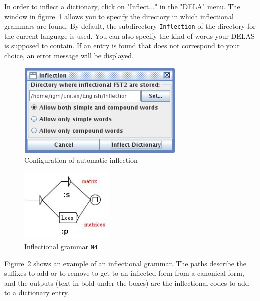 \bigskip
\noindent In order to  inflect a dictionary, click on "Inflect..." in the "DELA" menu. The
window in figure~\ref{fig-inflection-configuration} allows you to specify the
directory in which inflectional grammars are found. By default, the subdirectory
\verb+Inflection+ of the directory for the current language is used. You can
also specify the kind of words your DELAS is supposed to contain. If an entry is
found that does not correspond to your choice, an error message will be
displayed.

\bigskip
\begin{figure}[h]
\begin{center}
\includegraphics[width=8cm]{resources/img/fig3-7.png}
\caption{Configuration of automatic inflection\label{fig-inflection-configuration}}
\end{center}
\end{figure}

\bigskip
\begin{figure}[h]
\begin{center}
\includegraphics[width=4.5cm]{resources/img/fig3-8.png}
\caption{Inflectional grammar
\texttt{N4}\label{fig-example-inflectional-grammar}}
\end{center}
\end{figure}

\bigskip
\noindent Figure~\ref{fig-example-inflectional-grammar} shows an example of an
inflectional grammar. The paths describe the suffixes to add or to remove to
get to an inflected form from a canonical form, and the outputs (text in bold under the boxes) are the
inflectional codes to add to a dictionary entry.

